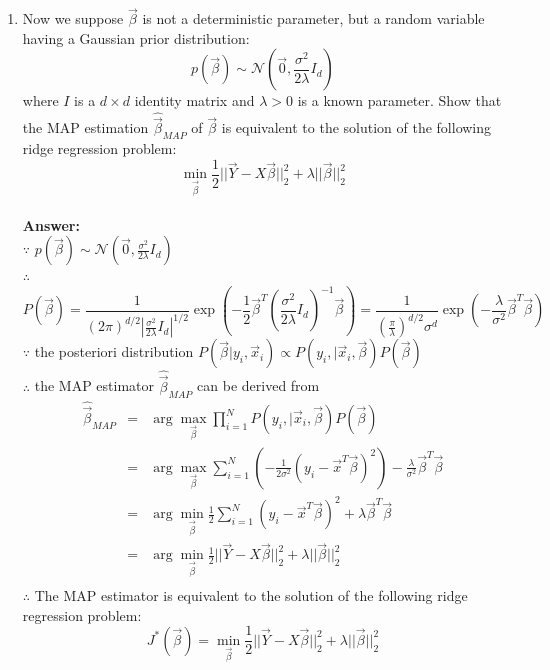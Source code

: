 \documentclass{article}
\begin{document}
\begin{enumerate}
	\item Now we suppose $\vec{\beta}$ is not a deterministic parameter, but a random variable having a Gaussian prior distribution:
	$$p(\vec{\beta}) \sim \mathcal{N}(\vec{0},\frac{\sigma^2}{2\lambda}I_d)$$
	where $I$ is a $d \times d$ identity matrix and $\lambda>0$ is a known parameter. Show that the MAP estimation $\hat{\vec{\beta}}_{MAP}$ of $\vec{\beta}$ is equivalent to the solution of the following ridge regression problem:
	\begin{equation}
	\label{eq:MAP}
	\min_{\vec{\beta}} \frac{1}{2} ||\vec{Y}-X\vec{\beta}||_2^2+\lambda||\vec{\beta}||_2^2
	\end{equation}
	\\\textbf{Answer:}\\
	$\because$ $p(\vec{\beta}) \sim \mathcal{N}(\vec{0},\frac{\sigma^2}{2\lambda}I_d)$\\
	$\therefore$
	$$P(\vec{\beta}) = \frac{1}{(2\pi)^{d/2}|\frac{\sigma^2}{2\lambda}I_d|^{1/2}}\exp(-\frac{1}{2}\vec{\beta}^T(\frac{\sigma^2}{2\lambda}I_d)^{-1}\vec{\beta})=\frac{1}{(\frac{\pi}{\lambda})^{d/2}\sigma^d}\exp(-\frac{\lambda}{\sigma^2}\vec{\beta}^T\vec{\beta})$$
	$\because$ the posteriori distribution $P(\vec{\beta}|y_i,\vec{x}_i) \propto P(y_i,|\vec{x}_i,\vec{\beta})P(\vec{\beta})$ \\
	$\therefore$ the MAP estimator $\hat{\vec{\beta}}_{MAP}$ can be derived from
	\begin{equation}
	\nonumber
	\begin{array}{rcl}
	\hat{\vec{\beta}}_{MAP} & = & \arg\max_{\vec{\beta}}{\prod_{i=1}^{N}{P(y_i,|\vec{x}_i,\vec{\beta})P(\vec{\beta})}} \\
							& = & \arg\max_{\vec{\beta}}\sum_{i=1}^{N}(-\frac{1}{2\sigma^2}(y_i-\vec{x}^T\vec{\beta})^2)-\frac{\lambda}{\sigma^2}\vec{\beta}^T\vec{\beta} \\
							& = & \arg\min_{\vec{\beta}}\frac{1}{2}\sum_{i=1}^{N}(y_i-\vec{x}^T\vec{\beta})^2+\lambda\vec{\beta}^T\vec{\beta} \\
							& = & \arg\min_{\vec{\beta}}\frac{1}{2}||\vec{Y}-X\vec{\beta}||_2^2 + \lambda||\vec{\beta}||_2^2\\
	\end{array}
	\end{equation}
	$\therefore$ The MAP estimator is equivalent to the solution of the following ridge regression problem:
	$$J^*(\vec{\beta})=\min_{\vec{\beta}} \frac{1}{2} ||\vec{Y}-X\vec{\beta}||_2^2+\lambda||\vec{\beta}||_2^2$$
	

\end{enumerate}
\end{document}
